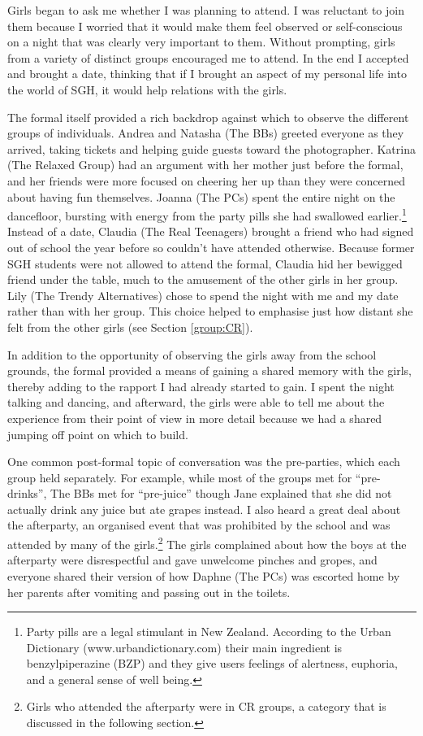 Girls began to ask me whether I was planning to attend.  I was reluctant to join them because I worried that it would make them feel observed or self-conscious on a night that was clearly very important to them.  Without prompting, girls from a variety of distinct groups encouraged me to attend.  In the end I accepted and brought a date, thinking that if I brought an aspect of my personal life into the world of SGH, it would help relations with the girls. 

The formal itself provided a rich backdrop against which to observe the different groups of individuals.  Andrea and Natasha (The BBs) greeted everyone as they arrived, taking tickets and helping guide guests toward the photographer.  Katrina (The Relaxed Group) had an argument with her mother just before the formal, and her friends were more focused on cheering her up than they were concerned about having fun themselves.   Joanna (The PCs) spent the entire night on the dancefloor, bursting with energy from the party pills she had swallowed earlier.\footnote{Party pills are a legal stimulant in New Zealand.  According to the Urban Dictionary (www.urbandictionary.com) their main ingredient is benzylpiperazine (BZP) and they give users feelings of alertness, euphoria, and a general sense of well being.}  Instead of a date, Claudia (The Real Teenagers) brought a friend who had signed out of school the year before so couldn't have attended otherwise.  Because former SGH students were not allowed to attend the formal, Claudia hid her bewigged friend under the table, much to the amusement of the other girls in her group.  Lily (The Trendy Alternatives) chose to spend the night with me and my date rather than with her group.  This choice helped to emphasise just how distant she felt from the other girls (see Section \ref{group:CR}).  
\nocite{urbandict}

In addition to the opportunity of observing the girls away from the school grounds, the formal provided a means of gaining a shared memory with the girls, thereby adding to the rapport I had already started to gain.  I spent the night talking and dancing, and afterward, the girls were able to tell me about the experience from their point of view in more detail because we had a shared jumping off point on which to build.  

One common post-formal topic of conversation was the pre-parties, which each group held separately. For example, while most of the groups met for ``pre-drinks'', The BBs met for ``pre-juice'' though Jane explained that she did not actually drink any juice but ate grapes instead. I also heard a great deal about the afterparty, an organised event that was prohibited by the school and was attended by many of the girls.\footnote{Girls who attended the afterparty were in CR groups, a category that is discussed in the following section.}  The girls complained about how the boys at the afterparty  were disrespectful and gave unwelcome pinches and gropes, and everyone shared their version of how Daphne (The PCs) was escorted home by her parents after vomiting and passing out in the toilets.

